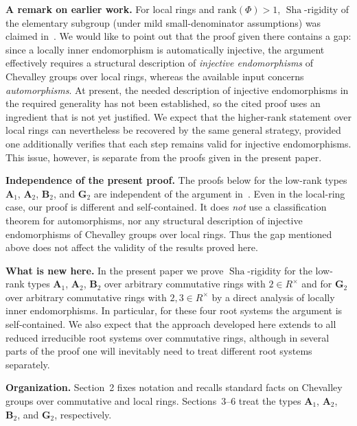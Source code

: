 \documentclass[]{jgcc}
\numberwithin{equation}{section}
\newcommand{\Sha}{\operatorname{Sha}}
\begin{document}
\medskip
\noindent\textbf{A remark on earlier work.}
For local rings and $\mathrm{rank}(\Phi)>1$, $\Sha$-rigidity of the elementary subgroup (under mild
small-denominator assumptions) was claimed in~\cite{BuninaKunyavskii2024}.
We would like to point out that the proof given there contains a gap:
since a locally inner endomorphism is automatically injective, the argument effectively requires
a structural description of \emph{injective endomorphisms} of Chevalley groups over local rings,
whereas the available input concerns \emph{automorphisms}.
At present, the needed description of injective endomorphisms in the required generality has not been established,
so the cited proof uses an ingredient that is not yet justified.
We expect that the higher-rank statement over local rings can nevertheless be recovered by the same general strategy,
provided one additionally verifies that each step remains valid for injective endomorphisms.
This issue, however, is separate from the proofs given in the present paper.

\medskip
\noindent\textbf{Independence of the present proof.}
The proofs below for the low-rank types $\mathbf A_1$, $\mathbf A_2$, $\mathbf B_2$, and $\mathbf G_2$
are independent of the argument in~\cite{BuninaKunyavskii2024}.
Even in the local-ring case, our proof is different and self-contained.
It does \emph{not} use a classification theorem for automorphisms,
nor any structural description of injective endomorphisms of Chevalley groups over local rings.
Thus the gap mentioned above does not affect the validity of the results proved here.

\medskip
\noindent\textbf{What is new here.}
In the present paper we prove $\Sha$-rigidity for the low-rank types
$\mathbf A_1$, $\mathbf A_2$, $\mathbf B_2$ over arbitrary commutative rings with $2\in R^\times$
and for $\mathbf G_2$ over arbitrary commutative rings with $2,3\in R^\times$
by a direct analysis of locally inner endomorphisms.
In particular, for these four root systems the argument is self-contained.
We also expect that the approach developed here extends to all reduced irreducible root systems over
commutative rings, although in several parts of the proof one will inevitably need
to treat different root systems separately.

\medskip\noindent\textbf{Organization.}
Section~2 fixes notation and recalls standard facts on Chevalley groups over commutative and local rings.
Sections~3--6 treat the types $\mathbf A_1$, $\mathbf A_2$, $\mathbf B_2$, and $\mathbf G_2$, respectively.
\end{document}
